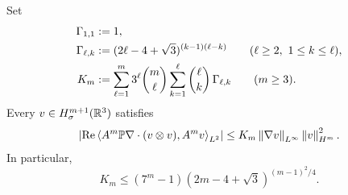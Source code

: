 \begin{lemma}
\label{lem:transport-commutator}
Set
\begin{align}
 \Gamma_{1,1}&:=1,\notag\\
 \Gamma_{\ell,k}
 &:=(2\ell-4+\sqrt3)^{(k-1)(\ell-k)}
 \qquad(\ell\ge2,\ 1\le k\le\ell),
 \label{eq:explicit-Gamma-lk}\\
 K_m&:=
 \sum_{\ell=1}^{m}3^\ell\binom m\ell
 \sum_{k=1}^{\ell}\binom\ell k\,\Gamma_{\ell,k}
 \qquad(m\ge3).
 \label{eq:explicit-commutator-constant}
\end{align}
Every \(v\in H^{m+1}_\sigma(\mathbb R^3)\) satisfies
\begin{equation}
 \left|\operatorname{Re}
 \left\langle A^m\mathbb P\nabla\cdot(v\otimes v),A^mv\right\rangle_{L^2}\right|
 \le K_m\left\lVert \nabla v\right\rVert_{L^\infty}\left\lVert v\right\rVert_{H^m}^2.
 \label{eq:transport-commutator}
\end{equation}
In particular,
\begin{equation}
 K_m\le(7^m-1)(2m-4+\sqrt3)^{(m-1)^2/4}.
 \label{eq:explicit-commutator-upper-bound}
\end{equation}
\end{lemma}

